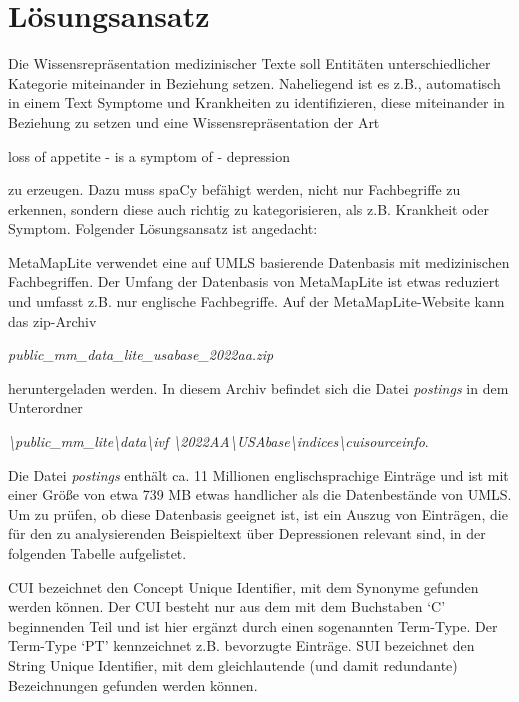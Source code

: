 \section{Lösungsansatz}

Die Wissensrepräsentation medizinischer Texte soll Entitäten unterschiedlicher Kategorie miteinander in Beziehung setzen. Naheliegend ist es z.B., automatisch in einem Text Symptome und Krankheiten zu identifizieren, diese miteinander in Beziehung zu setzen und eine Wissensrepräsentation der Art

\begin{center}
loss of appetite - is a symptom of - depression
\end{center}

zu erzeugen. Dazu muss spaCy befähigt werden, nicht nur Fachbegriffe zu erkennen, sondern diese auch richtig zu kategorisieren, als z.B. Krankheit oder Symptom. Folgender Lösungsansatz ist angedacht:

MetaMapLite verwendet eine auf UMLS basierende Datenbasis mit medizinischen Fachbegriffen. Der Umfang der Datenbasis von MetaMapLite ist etwas reduziert und umfasst z.B. nur englische Fachbegriffe. Auf der MetaMapLite-Website kann das zip-Archiv

\begin{center}
\emph{public\_mm\_data\_lite\_usabase\_2022aa.zip}
\end{center}

heruntergeladen werden. In diesem Archiv befindet sich die Datei \emph{postings} in dem Unterordner

\begin{center}
\emph{\textbackslash public\_mm\_lite\textbackslash data\textbackslash ivf \textbackslash 2022AA\textbackslash USAbase\textbackslash indices\textbackslash cuisourceinfo}.
\end{center}

Die Datei \emph{postings} enthält ca. 11 Millionen englischsprachige Einträge und ist mit einer Größe von etwa 739 MB etwas handlicher als die Datenbestände von UMLS. Um zu prüfen, ob diese Datenbasis geeignet ist, ist ein Auszug von Einträgen, die für den zu analysierenden Beispieltext über Depressionen relevant sind, in der folgenden Tabelle aufgelistet.

CUI bezeichnet den Concept Unique Identifier, mit dem Synonyme gefunden werden können. Der CUI besteht nur aus dem mit dem Buchstaben `C' beginnenden Teil und ist hier ergänzt durch einen sogenannten Term-Type. Der Term-Type `PT' kennzeichnet z.B. bevorzugte Einträge. SUI bezeichnet den String Unique Identifier, mit dem gleichlautende (und damit redundante) Bezeichnungen gefunden werden können.

